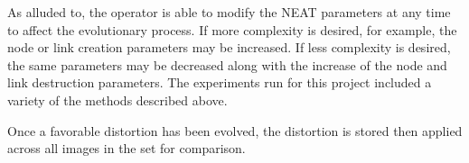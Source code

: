 As alluded to, the operator is able to modify the NEAT parameters at any time to affect the evolutionary process. If more complexity is desired, for example, the node or link creation parameters may be increased. If less complexity is desired, the same parameters may be decreased along with the increase of the node and link destruction parameters. The experiments run for this project included a variety of the methods described above.

Once a favorable distortion has been evolved, the distortion is stored then applied across all images in the set for comparison.